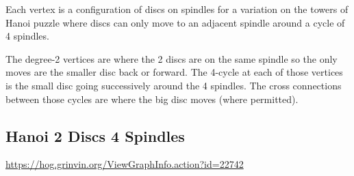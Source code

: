 \documentclass{article}
\begin{document}
Each vertex is a configuration of discs on spindles for a variation on
the towers of Hanoi puzzle where discs can only move to an adjacent
spindle around a cycle of 4 spindles.

The degree-2 vertices are where the 2 discs are on the same spindle so
the only moves are the smaller disc back or forward.  The 4-cycle at
each of those vertices is the small disc going successively around the
4 spindles.  The cross connections between those cycles are where the
big disc moves (where permitted).


\subsection{Hanoi 2 Discs 4 Spindles}

\url{https://hog.grinvin.org/ViewGraphInfo.action?id=22742}
\end{document}
